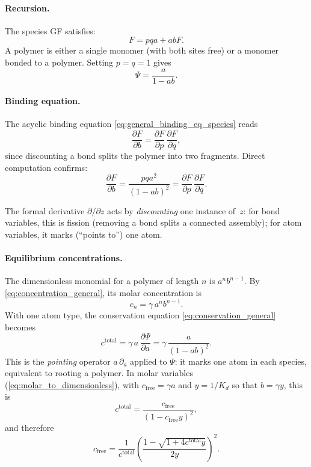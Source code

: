 \documentclass[11pt]{amsart}
\newcommand{\GFspecies}{F}
\newcommand{\GFcomb}{\Psi}
\newcommand{\PDeriv}[2]{\frac{\partial #1}{\partial #2}}
\theoremstyle{definition}
\theoremstyle{plain}
\theoremstyle{remark}
\begin{document}
\paragraph{Recursion.}
The species GF satisfies:
\begin{equation}\label{eq:linear_recursion}
\GFspecies = pqa + ab\GFspecies.
\end{equation}
A polymer is either a single monomer (with both sites free) or a monomer bonded to a polymer.
Setting $p=q=1$ gives
\[
\GFcomb = \frac{a}{1-ab}.
\]

\paragraph{Binding equation.}
The acyclic binding equation \eqref{eq:general_binding_eq_species} reads
\begin{equation}\label{eq:linear_polymer_discounting_identity}
\PDeriv{\GFspecies}{b} = \PDeriv{\GFspecies}{p}\,\PDeriv{\GFspecies}{q},
\end{equation}
since discounting a bond splits the polymer into two fragments.
Direct computation confirms:
\[
\PDeriv{\GFspecies}{b}
= \frac{pqa^2}{(1-ab)^2}
= \PDeriv{\GFspecies}{p}\,\PDeriv{\GFspecies}{q}.
\]

The formal derivative $\partial/\partial z$ acts by \emph{discounting} one instance of~$z$: for bond variables, this is fission (removing a bond splits a connected assembly); for atom variables, it marks (``points to'') one atom.

\paragraph{Equilibrium concentrations.}
The dimensionless monomial for a polymer of length $n$ is $a^n b^{n-1}$.
By \eqref{eq:concentration_general}, its molar concentration is
\[
c_n = \gamma\,a^n b^{n-1}.
\]
With one atom type, the conservation equation \eqref{eq:conservation_general} becomes
\begin{equation}\label{eq:linear_conservation}
c^{\mathrm{total}} = \gamma\,a\,\PDeriv{\GFcomb}{a} = \gamma\,\frac{a}{(1-ab)^2}.
\end{equation}
This is the \emph{pointing} operator $a\,\partial_a$ applied to $\GFcomb$: it marks one atom in each species, equivalent to rooting a polymer.
In molar variables (\eqref{eq:molar_to_dimensionless}), with $c_{\mathrm{free}}=\gamma a$ and $y=1/K_d$ so that $b=\gamma y$, this is
\[
c^{\mathrm{total}} = \frac{c_{\mathrm{free}}}{(1-c_{\mathrm{free}}y)^2},
\]
and therefore
\[
c_{\mathrm{free}}
= \frac{1}{c^{\mathrm{total}}}
\left(\frac{1-\sqrt{1+4c^{\mathrm{total}}y}}{2y}\right)^2.
\]
\end{document}
